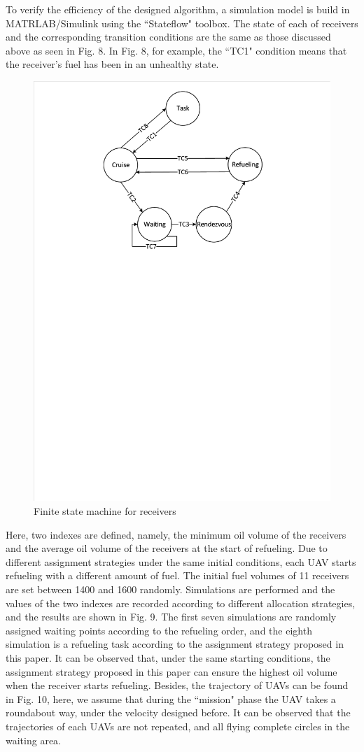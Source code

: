 To verify the efficiency of the designed algorithm, a simulation model is build in MATRLAB/Simulink using the ``Stateflow" toolbox. The state of each of receivers and the corresponding transition conditions are the same as those discussed above as seen in Fig. 8. In Fig. 8, for example, the ``TC1" condition means that the receiver's fuel has been in an unhealthy state.
\begin{figure}[htbp]
	\centerline{\includegraphics[width=.3\textwidth]{Figures/Figs_Ch15/fig8.pdf}}
	\caption{Finite state machine for receivers}
	\label{fig}
\end{figure}


Here, two indexes are defined, namely, the minimum oil volume of the receivers  and the average oil volume of the receivers at the start of refueling. Due to different assignment strategies under the same initial conditions, each UAV starts refueling with a different amount of fuel. The initial fuel volumes of 11 receivers are set between 1400 and 1600 randomly. Simulations are performed and the values of the two indexes are recorded according to different allocation strategies, and the results are shown in Fig. 9. The first seven simulations are randomly assigned waiting points according to the refueling order, and the eighth simulation is a refueling task according to the assignment strategy proposed in this paper. It can be observed that, under the same starting conditions, the assignment strategy proposed in this paper can ensure the highest oil volume when the receiver starts refueling. Besides, the trajectory of UAVs can be found in Fig. 10, here, we assume that during the ``mission" phase the UAV takes a roundabout way, under the velocity designed before. It can be observed that the trajectories of each UAVs are not repeated, and all flying complete circles in the waiting area.



